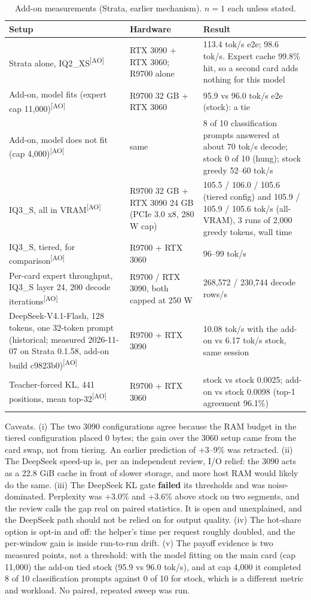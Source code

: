 \documentclass[11pt]{article}
\newcommand{\rl}[1]{\textsuperscript{\textnormal{[#1]}}} %
\begin{document}
\begin{table}[t]
\centering\footnotesize
\begin{tabular}{@{}p{3.6cm}p{3.4cm}p{7.2cm}@{}}
\toprule
Setup & Hardware & Result\\
\midrule
Strata alone, IQ2\_XS\rl{AO} & RTX 3090 + RTX 3060; R9700 alone & 113.4 tok/s e2e; 98.6 tok/s. Expert cache 99.8\% hit, so a second card adds nothing for this model\\
Add-on, model fits (expert cap 11,000)\rl{AO} & R9700 32 GB + RTX 3060 & 95.9 vs 96.0 tok/s e2e (stock): a tie\\
Add-on, model does not fit (cap 4,000)\rl{AO} & same & 8 of 10 classification prompts answered at about 70 tok/s decode; stock 0 of 10 (hung); stock greedy 52--60 tok/s\\
IQ3\_S, all in VRAM\rl{AO} & R9700 32 GB + RTX 3090 24 GB (PCIe 3.0 x8, 280 W cap) & 105.5 / 106.0 / 105.6 (tiered config) and 105.9 / 105.9 / 105.6 tok/s (all-VRAM), 3 runs of 2,000 greedy tokens, wall time\\
IQ3\_S, tiered, for comparison\rl{AO} & R9700 + RTX 3060 & 96--99 tok/s\\
Per-card expert throughput, IQ3\_S layer 24, 200 decode iterations\rl{AO} & R9700 / RTX 3090, both capped at 250 W & 268,572 / 230,744 decode rows/s\\
DeepSeek-V4.1-Flash, 128 tokens, one 32-token prompt (historical; measured 2026-11-07 on Strata 0.1.58, add-on build c9823b0)\rl{AO} & R9700 + RTX 3090 & 10.08 tok/s with the add-on vs 6.17 tok/s stock, same session\\
Teacher-forced KL, 441 positions, mean top-32\rl{AO} & R9700 + RTX 3060 & stock vs stock 0.0025; add-on vs stock 0.0098 (top-1 agreement 96.1\%)\\
\bottomrule
\end{tabular}
\caption{Add-on measurements (Strata, earlier mechanism). $n=1$ each unless stated.}
\label{tab:addon}
\end{table}

Caveats. (i) The two 3090 configurations agree because the RAM budget in the tiered configuration placed
0 bytes; the gain over the 3060 setup came from the card swap, not from tiering. An earlier prediction of +3--9\% was
retracted. (ii) The DeepSeek speed-up is, per an independent review, I/O relief: the 3090 acts as a 22.8 GiB cache in
front of slower storage, and more host RAM would likely do the same. (iii) The DeepSeek KL gate \textbf{failed}
its thresholds and was noise-dominated. Perplexity was +3.0\% and +3.6\% above stock on two segments, and the review calls
the gap real on paired statistics. It is open and unexplained, and the DeepSeek path should not be relied on for output
quality. (iv) The hot-share option is opt-in and off: the helper's time per request roughly doubled, and the per-window
gain is inside run-to-run drift. (v) The payoff evidence is two measured points, not a threshold: with the model fitting on the main card
(cap 11,000) the add-on tied stock (95.9 vs 96.0 tok/s), and at cap 4,000 it completed 8 of 10 classification prompts
against 0 of 10 for stock, which is a different metric and workload. No paired, repeated sweep was run.
\end{document}
